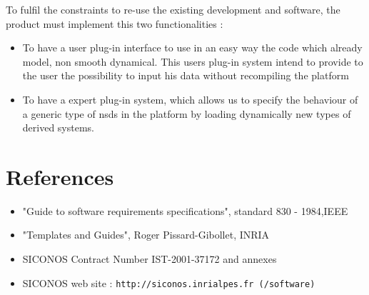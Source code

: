 To fulfil the constraints to re-use the existing development and software, the product must implement this two functionalities :
\begin{itemize}
\item To have a user plug-in interface to use in an easy way the code which already model, non smooth dynamical. This users plug-in system intend to provide to the user the possibility to input his data without recompiling the platform
\item To have a expert plug-in system, which allows us to specify the behaviour of a generic type of \ac{nsds} in the platform by loading dynamically new types of derived systems.
\end{itemize}


\section{References}
\label{Sec:GPD-References}
\begin{itemize}
\item "Guide to software requirements specifications", standard 830 - 1984,IEEE
\item "Templates and Guides", Roger Pissard-Gibollet, INRIA
\item \ac{SICONOS} Contract Number IST-2001-37172 and annexes
\item \ac{SICONOS} web site : \texttt{http://siconos.inrialpes.fr (/software)}
\end{itemize}




